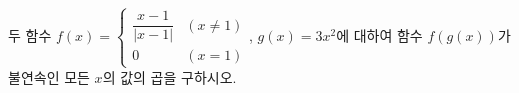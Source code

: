 두 함수 $f(x)=\begin{cases} \dfrac{x-1}{|x-1|} & (x\ne 1) \\ 0 & (x=1) \end{cases}$, $g(x)=3x^2$에 대하여 함수 $f(g(x))$가 불연속인 모든 $x$의 값의 곱을 구하시오.
